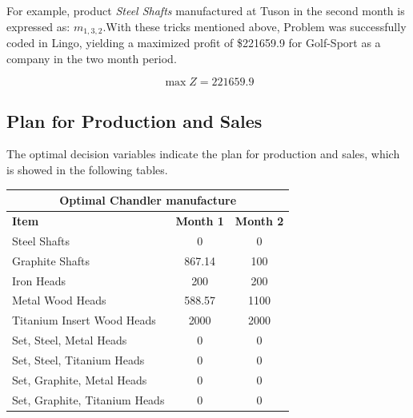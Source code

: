 \documentclass[12pt]{article}
\begin{document}
For example, product \textit{Steel Shafts} manufactured at Tuson in the second month is expressed as: $m_{1,3,2}$.With these tricks mentioned above, Problem was successfully coded in Lingo, yielding a maximized profit of \$221659.9 for Golf-Sport as a company in the two month period.\par

$$ \max Z = 221659.9$$

\subsection{Plan for Production and Sales}
The optimal decision variables indicate the plan for production and sales, which is showed in the following tables.\par

\noindent
\begin{center}
\begin{tabular}{ l c c }
\hline
\multicolumn{3}{c}{Optimal Chandler manufacture} \\
\hline
\textbf{Item} & \textbf{Month 1} & \textbf{Month 2} \\
Steel Shafts & 0 & 0 \\
Graphite Shafts & 867.14 & 100 \\
Iron Heads & 200 & 200 \\
Metal Wood Heads & 588.57 & 1100 \\
Titanium Insert Wood Heads & 2000 & 2000 \\
Set, Steel, Metal Heads & 0 & 0 \\
Set, Steel, Titanium Heads & 0 & 0 \\
Set, Graphite, Metal Heads & 0 & 0 \\
Set, Graphite, Titanium Heads & 0 & 0 \\
\hline
\end{tabular}
\vspace{5mm}
\\
\end{center}
\end{document}
